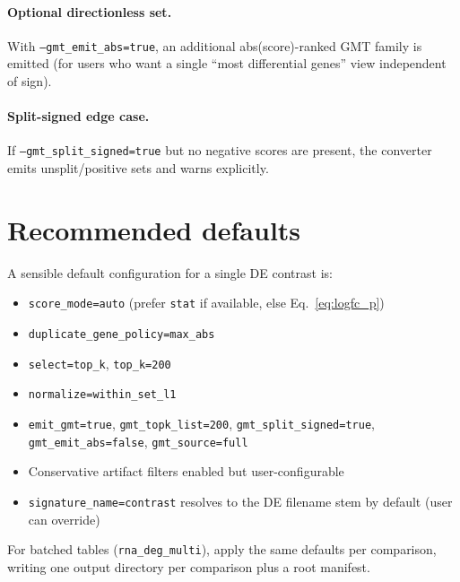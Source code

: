 \documentclass[11pt]{article}
\begin{document}
\paragraph{Optional directionless set.}
With \texttt{--gmt\_emit\_abs=true}, an additional abs(score)-ranked GMT family is emitted (for users who want a single ``most differential genes'' view independent of sign).

\paragraph{Split-signed edge case.}
If \texttt{--gmt\_split\_signed=true} but no negative scores are present, the converter emits unsplit/positive sets and warns explicitly.

\section{Recommended defaults}
A sensible default configuration for a single DE contrast is:
\begin{itemize}[leftmargin=2em]
\item \texttt{score\_mode=auto} (prefer \texttt{stat} if available, else Eq.\ \ref{eq:logfc_p})
\item \texttt{duplicate\_gene\_policy=max\_abs}
\item \texttt{select=top\_k}, \texttt{top\_k=200}
\item \texttt{normalize=within\_set\_l1}
\item \texttt{emit\_gmt=true}, \texttt{gmt\_topk\_list=200}, \texttt{gmt\_split\_signed=true}, \texttt{gmt\_emit\_abs=false}, \texttt{gmt\_source=full}
\item Conservative artifact filters enabled but user-configurable
\item \texttt{signature\_name=contrast} resolves to the DE filename stem by default (user can override)
\end{itemize}

For batched tables (\texttt{rna\_deg\_multi}), apply the same defaults per comparison, writing one output directory per comparison plus a root manifest.
\end{document}
